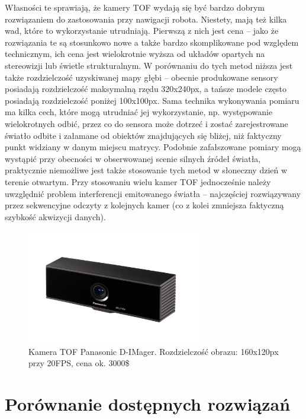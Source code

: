 Własności te sprawiają, że kamery TOF wydają się być bardzo dobrym rozwiązaniem
do zastosowania przy nawigacji robota. Niestety, mają też kilka wad, które to
wykorzystanie utrudniają. Pierwszą z nich jest cena -- jako że rozwiązania te są
stosunkowo nowe a także bardzo skomplikowane pod względem technicznym, ich cena
jest wielokrotnie wyższa od układów opartych na stereowizji lub świetle
strukturalnym. W porównaniu do tych metod niższa jest także rozdzielczość
uzyskiwanej mapy głębi -- obecnie produkowane sensory posiadają rozdzielczość
maksymalną rzędu 320x240px, a tańsze modele często posiadają rozdzielczość 
poniżej 100x100px. Sama technika wykonywania pomiaru ma kilka cech, które mogą
utrudniać jej wykorzystanie, np. występowanie wielokrotnych odbić, przez co
do sensora może dotrzeć i zostać zarejestrowane światło odbite i załamane od
obiektów znajdujących się bliżej, niż faktyczny punkt widziany w danym miejscu
matrycy. Podobnie zafałszowane pomiary mogą wystąpić przy obecności w
obserwowanej scenie silnych źródeł światła, praktycznie niemożliwe jest także
stosowanie tych metod w słoneczny dzień w terenie otwartym. Przy stosowaniu
wielu kamer TOF jednocześnie należy uwzględnić problem interferencji emitowanego
światła -- najczęściej rozwiązywany przez sekwencyjne odczyty z kolejnych kamer
(co z kolei zmniejsza faktyczną szybkość akwizycji danych).

\begin{figure}[h!]
\centering
\includegraphics[height=5cm]{../../Common/img/dimager} 
\caption[Kamera TOF Panasonic D-IMager]{Kamera TOF Panasonic D-IMager.
Rozdzielczość obrazu: 160x120px przy 20FPS, cena ok. 3000\$}
\label{fig:dimager}
\end{figure}

\section{Porównanie dostępnych rozwiązań}

